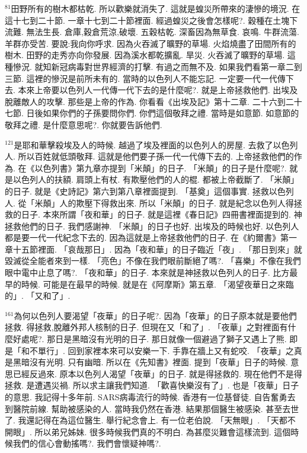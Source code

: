 \documentclass{book}
\begin{document}
$^{81}$田野所有的樹木都枯乾.
所以歡樂就消失了.
這就是蝗災所帶來的淒慘的境況.
在這十七到二十節.
一章十七到二十節裡面.
經過蝗災之後會怎樣呢?.
穀種在土塊下流難.
無法生長.
倉庫,穀倉荒涼,破壞.
五穀枯乾.
深畜因為無草食.
哀鳴.
牛群流蕩.
羊群亦受苦.
要說:我向你呼求.
因為火吞滅了曠野的草場.
火焰燒盡了田間所有的樹木.
田野的走秀亦向你發展.
因為溪水都乾擴亂.
旱災.
火吞滅了曠野的草場.
這種慘況.
就知新冠病毒對世界經濟的打擊.
有過之而無不及.
如果我們看第一章二到三節.
這裡的慘況是前所未有的.
當時的以色列人不能忘記.
一定要一代一代傳下去.
本來上帝要以色列人一代傳一代下去的是什麼呢?.
就是上帝拯救他們.
出埃及脫離敵人的攻擊.
那些是上帝的作為.
你看看《出埃及記》第十二章.
二十六到二十七節.
日後如果你們的子孫要問你們.
你們這個敬拜之禮.
當時是如意節.
如意節的敬拜之禮.
是什麼意思呢?.
你就要告訴他們.

$^{121}$是耶和華擊殺埃及人的時候.
越過了埃及裡面的以色列人的房屋.
去救了以色列人.
所以百姓就低頭敬拜.
這就是他們要子孫一代一代傳下去的.
上帝拯救他們的作為.
在《以色列書》第九章亦提到「米顛」的日子.
「米顛」的日子是什麼呢?.
就是以色列人的扶額.
肩頭上有杖.
有欺壓他們的人的棍.
都被上帝截斷了.
「米顛」的日子.
就是《史詩記》第六到第八章裡面提到.
「基奠」這個事實.
拯救以色列人.
從「米顛」人的欺壓下得救出來.
所以「米顛」的日子.
就是紀念以色列人得拯救的日子.
本來所謂「夜和華」的日子.
就是這裡《春日記》四冊書裡面提到的.
神拯救他們的日子.
我們感謝神.
「米顛」的日子也好.
出埃及的時候也好.
以色列人都是要一代一代紀念下去的.
因為這就是上帝拯救他們的日子.
在《約爾書》第一章十五節裡面.
「哀哉那日」.
因為「夜和華」的日子臨近「夜」.
「那日到來」就毀滅從全能者來到一樣.
「亮色」不像在我們眼前斷絕了嗎?.
「喜樂」不像在我們眼中電中止息了嗎?.
「夜和華」的日子.
本來就是神拯救以色列人的日子.
比方最早的時候.
可能是在最早的時候.
就是在《阿摩斯》第五章.
「渴望夜華日之來臨的」.
「又和了」.

$^{161}$為何以色列人要渴望「夜華」的日子呢?.
因為「夜華」的日子原本就是要他們拯救.
得拯救,脫離外邦人核制的日子.
但現在又「和了」.
「夜華」之對裡面有什麼好處呢?.
那日是黑暗沒有光明的日子.
那日就像一個避過了獅子又遇上了熊.
即是「和不單行」.
回到家裡本來可以安樂一下.
手靠在牆上又有蛇咬.
「夜華」之真是黑暗沒有光明.
只有幽暗.
所以在《先知書》裡面.
提到「夜華」日子的時候.
意思已經反過來.
原本以色列人渴望「夜華」的日子.
就是得拯救的.
現在他們不是得拯救.
是遭遇災禍.
所以求主讓我們知道.
「歡喜快樂沒有了」.
也是「夜華」日子的意思.
我記得十多年前.
SARS病毒流行的時候.
香港有一位基督徒.
自告奮勇去到醫院前線.
幫助被感染的人.
當時我仍然在香港.
結果那個醫生被感染.
甚至去世了.
我還記得在為這位醫生.
舉行紀念會上.
有一位老伯說.
「天無眼」.
「天都不開眼」.
所以弟兄姊妹.
很多時候我們真的不明白.
為甚麼災難會這樣流到.
這個時候我們的信心會動搖嗎?.
我們會懷疑神嗎?.
\end{document}
